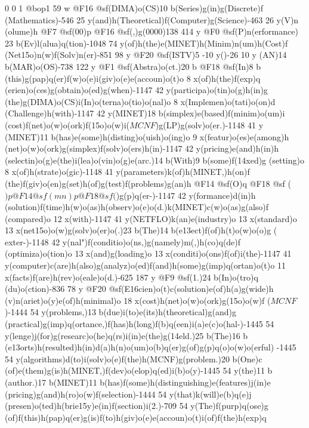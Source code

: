 0 0 1 @bop1 59 w @F16 @sf(DIMA)o(CS)10 b(Series)g(in)g(Discrete)f
(Mathematics)-546 25 y(and)h(Theoretical)f(Computer)g(Science)-463 26 y(V)n
(olume)h @F7 @sf(00)p @F16 @sf(,)g(0000)138 414 y @F0 @sf(P)n(erformance)
23 b(Ev)l(alua)q(tion)-1048 74 y(of)h(the)e(MINET)h(Minim)n(um)h(Cost)f
(Net\015o)n(w)f(Solv)n(er)-851 98 y @F20 @sf(ISTV)5 -10 y()-26 10 y
(AN)14 b(MAR)o(OS)-738 122 y @F1 @sf(Abstra)o(ct.)20 b @F18 @sf(In)8 b
(this)g(pap)q(er)f(w)o(e)i(giv)o(e)e(accoun)o(t)o 8 x(of)h(the)f(exp)q
(erien)o(ces)g(obtain)o(ed)g(when)-1147 42 y(participa)o(tin)o(g)h(in)g
(the)g(DIMA)o(CS)i(In)o(terna)o(tio)o(nal)o 8 x(Implemen)o(tati)o(on)d
(Challenge)h(with)-1147 42 y(MINET)18 b(simplex)e(based)f(minim)o(um)i
(cost)f(net)o(w)o(ork)f(\015o)o(w)i(\(MCNF\))g(LP)g(solv)o(er.)-1148 41 y
(MINET)11 b(has)e(some)h(disting)o(uish)o(ing)o 9 x(featur)o(es)e(among)h
(net)o(w)o(ork)g(simplex)f(solv)o(ers)h(in)-1147 42 y(pricing)e(and)h(in)h
(selectin)o(g)e(the)i(lea)o(vin)o(g)e(arc.)14 b(With)9 b(some)f(\014xed)g
(setting)o 8 x(of)h(strate)o(gic)-1148 41 y(parameters)k(of)h(MINET,)h(on)f
(the)f(giv)o(en)g(set)h(of)g(test)f(problems)g(an)h @F14 @sf(O)q @F18 @sf
(\()p @F14 @sf(mn)p @F18 @sf(\))g(p)q(er-)-1147 42 y(formance)d(in)h
(solution)f(time)h(w)o(as)h(observ)o(e)o(d.)k(MINET)c(w)o(as)g(also)f
(compared)o 12 x(with)-1147 41 y(NETFLO)k(an)e(industry)o 13 x(standard)o 
13 x(net\015o)o(w)g(solv)o(er)o(.)23 b(The)14 b(e\013ect)f(of)h(t)o(w)o(o)g
(\\exter-)-1148 42 y(nal")f(conditio)o(ns,)g(namely)m(,)h(co)q(de)f
(optimiza)o(tion)o 13 x(and)g(loading)o 13 x(conditi)o(ons)f(of)i(the)-1147 
41 y(computer)c(are)h(also)g(analyz)o(ed)f(and)h(some)g(imp)q(ortan)o(t)o 
11 x(facts)f(are)h(rev)o(eale)o(d.)-625 187 y @F9 @sf(1.)24 b(In)o(tro)q
(du)o(ction)-836 78 y @F20 @sf(E\016cien)o(t)c(solution)e(of)h(a)g(wide)h
(v)n(ariet)o(y)e(of)h(minimal)o 18 x(cost)h(net)o(w)o(ork)g(\015o)o(w)f
(\(MCNF\))-1444 54 y(problems,)13 b(due)i(to)e(its)h(theoretical)g(and)g
(practical)g(imp)q(ortance,)f(has)h(long)f(b)q(een)i(a)e(c)o(hal-)-1445 
54 y(lenge)j(for)g(researc)o(he)q(rs)i(in)e(the)g(\014eld.)25 b(The)16 b
(e\013orts)h(resulted)h(in)d(a)h(n)o(um)o(b)q(er)g(of)g(p)q(o)o(w)o(erful)
-1445 54 y(algorithms)d(to)i(solv)o(e)f(the)h(MCNF)g(problem.)20 b(One)c
(of)e(them)g(is)h(MINET,)f(dev)o(elop)q(ed)i(b)o(y)-1445 54 y(the)11 b
(author.)17 b(MINET)11 b(has)f(some)h(distinguishing)e(features)j(in)e
(pricing)g(and)h(ro)o(w)f(selection)-1444 54 y(that)k(will)e(b)q(e)j
(presen)o(ted)h(brie\015y)e(in)f(section)i(2.)-709 54 y(The)f(purp)q(ose)g
(of)f(this)h(pap)q(er)g(is)f(to)h(giv)o(e)e(accoun)o(t)i(of)f(the)h(exp)q

